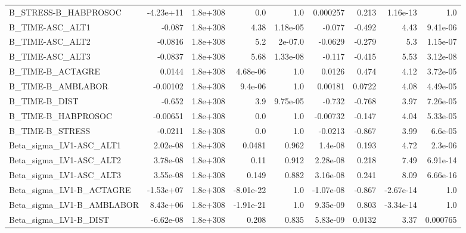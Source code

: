 \begin{tabular}{lrrrrrrrr}
B\_STRESS-B\_HABPROSOC          &   -4.23e+11 &     1.8e+308 &       0.0 &      1.0 &   0.000257 &       0.213 &     1.16e-13 &           1.0 \\
B\_TIME-ASC\_ALT1               &      -0.087 &     1.8e+308 &      4.38 & 1.18e-05 &     -0.077 &      -0.492 &         4.43 &      9.41e-06 \\
B\_TIME-ASC\_ALT2               &     -0.0816 &     1.8e+308 &       5.2 &  2e-07.0 &    -0.0629 &      -0.279 &          5.3 &      1.15e-07 \\
B\_TIME-ASC\_ALT3               &     -0.0837 &     1.8e+308 &      5.68 & 1.33e-08 &     -0.117 &      -0.415 &         5.53 &      3.12e-08 \\
B\_TIME-B\_ACTAGRE              &      0.0144 &     1.8e+308 &  4.68e-06 &      1.0 &     0.0126 &       0.474 &         4.12 &      3.72e-05 \\
B\_TIME-B\_AMBLABOR             &    -0.00102 &     1.8e+308 &   9.4e-06 &      1.0 &    0.00181 &      0.0722 &         4.08 &      4.49e-05 \\
B\_TIME-B\_DIST                 &      -0.652 &     1.8e+308 &       3.9 & 9.75e-05 &     -0.732 &      -0.768 &         3.97 &      7.26e-05 \\
B\_TIME-B\_HABPROSOC            &    -0.00651 &     1.8e+308 &       0.0 &      1.0 &   -0.00732 &      -0.147 &         4.04 &      5.33e-05 \\
B\_TIME-B\_STRESS               &     -0.0211 &     1.8e+308 &       0.0 &      1.0 &    -0.0213 &      -0.867 &         3.99 &       6.6e-05 \\
Beta\_sigma\_LV1-ASC\_ALT1       &    2.02e-08 &     1.8e+308 &    0.0481 &    0.962 &    1.4e-08 &       0.193 &         4.72 &       2.3e-06 \\
Beta\_sigma\_LV1-ASC\_ALT2       &    3.78e-08 &     1.8e+308 &      0.11 &    0.912 &   2.28e-08 &       0.218 &         7.49 &      6.91e-14 \\
Beta\_sigma\_LV1-ASC\_ALT3       &    3.55e-08 &     1.8e+308 &     0.149 &    0.882 &   3.16e-08 &       0.241 &         8.09 &      6.66e-16 \\
Beta\_sigma\_LV1-B\_ACTAGRE      &   -1.53e+07 &     1.8e+308 & -8.01e-22 &      1.0 &  -1.07e-08 &      -0.867 &    -2.67e-14 &           1.0 \\
Beta\_sigma\_LV1-B\_AMBLABOR     &    8.43e+06 &     1.8e+308 & -1.91e-21 &      1.0 &   9.35e-09 &       0.803 &    -3.34e-14 &           1.0 \\
Beta\_sigma\_LV1-B\_DIST         &   -6.62e-08 &     1.8e+308 &     0.208 &    0.835 &   5.83e-09 &      0.0132 &         3.37 &      0.000765 \\

\end{tabular}
